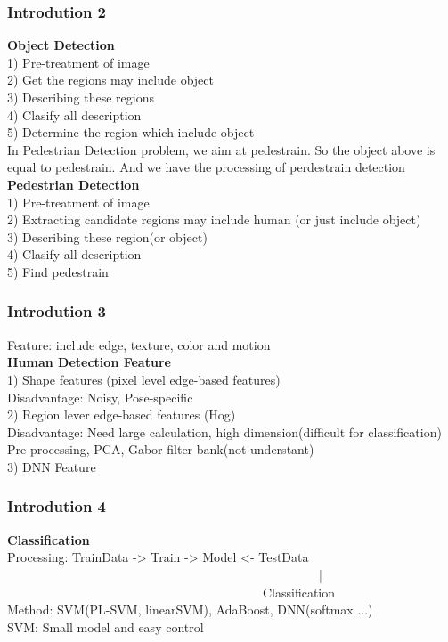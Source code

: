 \documentclass{beamer}
\begin{document}
\begin{frame}
\frametitle{Introdution 2}
\textbf{Object Detection}
\\1) Pre-treatment of image
\\2) Get the regions may include object
\\3) Describing these regions
\\4) Clasify all description
\\5) Determine the region which include object
\\[2ex]
In Pedestrian Detection problem, we aim at pedestrain. So the object above is equal to pedestrain. And we have the processing of perdestrain detection
\\[2ex]
\textbf{Pedestrian Detection}
\\1) Pre-treatment of image
\\2) Extracting candidate regions may include human (or just include object)
\\3) Describing these region(or object)
\\4) Clasify all description
\\5) Find pedestrain
\end{frame}



\begin{frame}
\frametitle{Introdution 3}
Feature: include edge, texture, color and motion\\[2ex]
\textbf{Human Detection Feature}\cite{Nguyen2016}
\\1) Shape features (pixel level edge-based features)
\\Disadvantage: Noisy, Pose-specific\\[1ex] 
2) Region lever edge-based features (Hog)
\\Disadvantage: Need large calculation, high dimension(difficult for classification)
\\Pre-processing, PCA, Gabor filter bank(not understant)\\[2ex]
3) DNN Feature
\end{frame}



\begin{frame}
\frametitle{Introdution 4}
\textbf{Classification}
\\Processing:  TrainData -> Train -> Model <- TestData\\
\ \ \ \ \ \ \ \ \ \ \ \ \ \ \ \ \ \ \ \ \ \ \ \ \ \ \ \ \ \ \ \ \ \ \ \ \ \ \ \ \ \ \ \ \ \ \ \ \ \ |\\
\ \ \ \ \ \ \ \ \ \ \ \ \ \ \ \ \ \ \ \ \ \ \ \ \ \ \ \ \ \ \ \ \ \ \ \ \ \ \ \ \ Classification
\\Method: SVM(PL-SVM, linearSVM), AdaBoost, DNN(softmax ...)
\\SVM: Small model and easy control
\end{frame}
\end{document}
